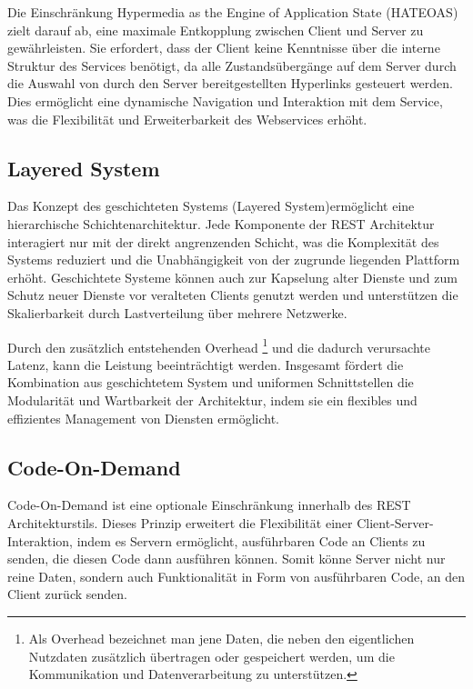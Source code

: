 \documentclass[draft,final]{vutinfth} %
\begin{document}
Die Einschränkung Hypermedia as the Engine of Application State (HATEOAS) zielt darauf ab, eine maximale Entkopplung zwischen Client und Server zu gewährleisten. 
Sie erfordert, dass der Client keine Kenntnisse über die interne Struktur des Services benötigt, da alle Zustandsübergänge auf dem Server durch die Auswahl von durch den Server bereitgestellten Hyperlinks gesteuert werden. 
Dies ermöglicht eine dynamische Navigation und Interaktion mit dem Service, was die Flexibilität und Erweiterbarkeit des Webservices erhöht. \cite{Fielding:2000:REST}


\subsection{Layered System}

Das Konzept des geschichteten Systems (Layered System)ermöglicht eine hierarchische Schichtenarchitektur. 
Jede Komponente der REST Architektur interagiert nur mit der direkt angrenzenden Schicht, was die Komplexität des Systems reduziert und die Unabhängigkeit von der zugrunde liegenden Plattform erhöht. 
Geschichtete Systeme können auch zur Kapselung alter Dienste und zum Schutz neuer Dienste vor veralteten Clients genutzt werden und unterstützen die Skalierbarkeit durch Lastverteilung über mehrere Netzwerke.

Durch den zusätzlich entstehenden Overhead
\footnote{
	Als Overhead bezeichnet man jene Daten, die neben den eigentlichen Nutzdaten zusätzlich übertragen oder gespeichert werden, um die Kommunikation und Datenverarbeitung zu unterstützen.
}
und die dadurch verursachte Latenz, kann die Leistung beeinträchtigt werden.
Insgesamt fördert die Kombination aus geschichtetem System und uniformen Schnittstellen die Modularität und Wartbarkeit der Architektur, indem sie ein flexibles und effizientes Management von Diensten ermöglicht. \cite{Fielding:2000:REST}


\subsection{Code-On-Demand}

Code-On-Demand ist eine optionale Einschränkung innerhalb des REST Architekturstils. 
Dieses Prinzip erweitert die Flexibilität einer Client-Server-Interaktion, indem es Servern ermöglicht, ausführbaren Code an Clients zu senden, die diesen Code dann ausführen können. 
Somit könne Server nicht nur reine Daten, sondern auch Funktionalität in Form von ausführbaren Code, an den Client zurück senden. \cite{Fielding:2000:REST}
\end{document}
